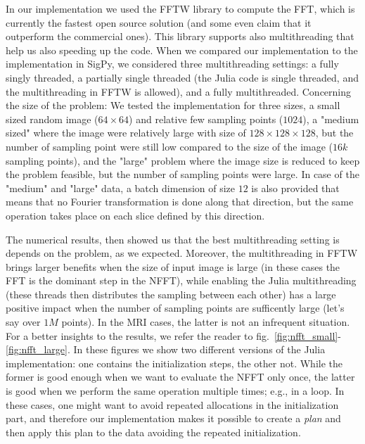 In our implementation we used the FFTW library to compute the FFT, which is currently the fastest open source solution (and some even claim that it outperform the commercial ones). This library supports also multithreading that help us also speeding up the code. When we compared our implementation to the implementation in SigPy, we considered three multithreading settings: a fully singly threaded, a partially single threaded (the Julia code is single threaded, and the multithreading in FFTW is allowed), and a fully multithreaded. Concerning the size of the problem: We tested the implementation for three sizes, a small sized random image ($64\times64$) and relative few sampling points ($1024$), a "medium sized" where the image were relatively large with size of $128\times128\times128$, but the number of sampling point were still low compared to the size of the image ($16k$ sampling points), and the "large" problem where the image size is reduced to keep the problem feasible, but the number of sampling points were large. In case of the "medium" and "large" data, a batch dimension of size $12$ is also provided that means that no Fourier transformation is done along that direction, but the same operation takes place on each slice defined by this direction.

The numerical results, then showed us that the best multithreading setting is depends on the problem, as we expected. Moreover, the multithreading in FFTW brings larger benefits when the size of input image is large (in these cases the FFT is the dominant step in the NFFT), while enabling the Julia multithreading (these threads then distributes the sampling between each other) has a large positive impact when the number of sampling points are sufficently large (let's say over $1M$ points). In the MRI cases, the latter is not an infrequent situation. For a better insights to the results, we refer the reader to fig.~\ref{fig:nfft_small}-\ref{fig:nfft_large}. In these figures we show two different versions of the Julia implementation: one contains the initialization steps, the other not. While the former is good enough when we want to evaluate the NFFT only once, the latter is good when we perform the same operation multiple times; e.g., in a loop. In these cases, one might want to avoid repeated allocations in the initialization part, and therefore our implementation makes it possible to create a \textit{plan} and then apply this plan to the data avoiding the repeated initialization.

